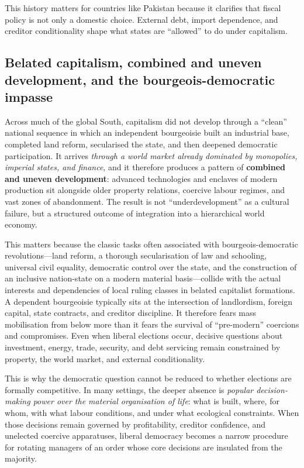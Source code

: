 This history matters for countries like Pakistan because it clarifies that fiscal policy is not only a domestic choice.
External debt, import dependence, and creditor conditionality shape what states are ``allowed'' to do under capitalism.

\subsection{Belated capitalism, combined and uneven development, and the bourgeois-democratic impasse}
\label{subsec:combined-uneven}

Across much of the global South, capitalism did not develop through a
``clean'' national sequence in which an independent bourgeoisie built an
industrial base, completed land reform, secularised the state, and then
deepened democratic participation. It arrives
\emph{through a world market already dominated by monopolies, imperial states, and finance}, and it therefore
produces a pattern of \textbf{combined and uneven development}: advanced technologies and enclaves of modern
production sit alongside older property relations, coercive labour regimes, and vast zones of abandonment.\cite{TrotskyPermanentRevolution,RosenbergUCD}
The result is not ``underdevelopment'' as a cultural failure, but a structured outcome of integration into a
hierarchical world economy.\cite{LeninImperialism,PatnaikImperialism}

This matters because the classic tasks often associated with bourgeois-democratic revolutions---land reform,
a thorough secularisation of law and schooling, universal civil equality, democratic control over the state,
and the construction of an inclusive nation-state on a modern material basis---collide with the actual
interests and dependencies of local ruling classes in belated capitalist formations. A dependent bourgeoisie
typically sits at the intersection of landlordism, foreign capital, state contracts, and creditor discipline.
It therefore fears mass mobilisation from below more than it fears the survival of ``pre-modern'' coercions
and compromises. Even when liberal elections occur, decisive questions about investment, energy, trade,
security, and debt servicing remain constrained by property, the world market, and external conditionality.\cite{PeetUnholyTrinity,HarveyNeoliberalism}

This is why the democratic question cannot be reduced to whether elections are formally competitive. In many
settings, the deeper absence is \emph{popular decision-making power over the material organisation of life}:
what is built, where, for whom, with what labour conditions, and under what ecological constraints. When those
decisions remain governed by profitability, creditor confidence, and unelected coercive apparatuses, liberal
democracy becomes a narrow procedure for rotating managers of an order whose core decisions are insulated from
the majority.

